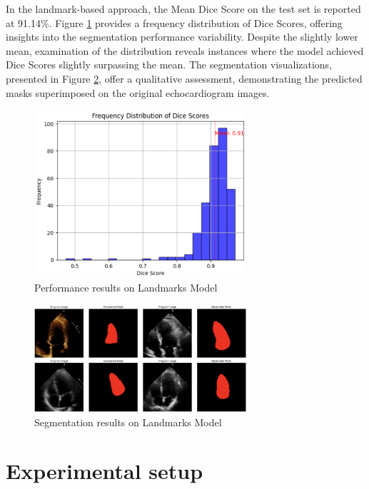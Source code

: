 \documentclass[runningheads]{llncs}
\begin{document}
In the landmark-based approach, the Mean Dice Score on the test set is reported at 91.14\%. Figure \ref{fig:histogramalm} provides a frequency distribution of Dice Scores, offering insights into the segmentation performance variability. Despite the slightly lower mean, examination of the distribution reveals instances where the model achieved Dice Scores slightly surpassing the mean. The segmentation visualizations, presented in Figure \ref{fig:lm1s}, offer a qualitative assessment, demonstrating the predicted masks superimposed on the original echocardiogram images.

\begin{figure}[H]
    \centering
    \includegraphics[width=0.7\textwidth]{histogramalm.jpg}
    \caption{Performance results on Landmarks Model}
    \label{fig:histogramalm}
\end{figure}

\begin{figure}[H]
    \centering
    \includegraphics[width=0.7\textwidth]{lm1s.jpg}
    \caption{Segmentation results on Landmarks Model}
    \label{fig:lm1s}
\end{figure}

\section{Experimental setup}
\end{document}
